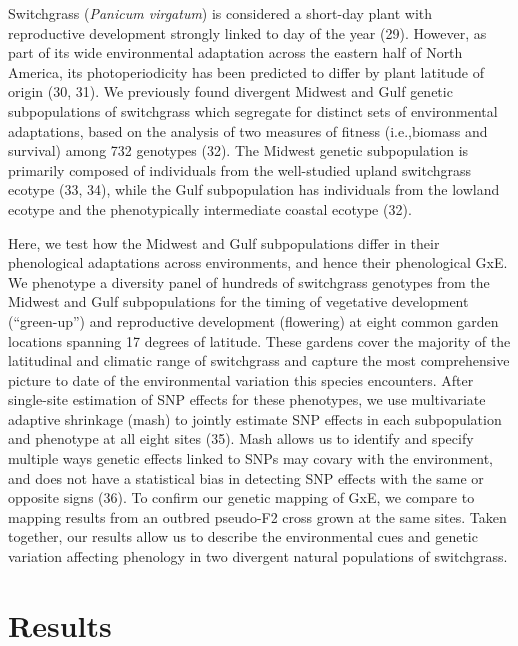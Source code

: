 \documentclass[
  9pt,
  twocolumn,
  twoside]{pnas-new}
\begin{document}
Switchgrass (\emph{Panicum virgatum}) is considered a short-day plant
with reproductive development strongly linked to day of the year (29).
However, as part of its wide environmental adaptation across the eastern
half of North America, its photoperiodicity has been predicted to differ
by plant latitude of origin (30, 31). We previously found divergent
Midwest and Gulf genetic subpopulations of switchgrass which segregate
for distinct sets of environmental adaptations, based on the analysis of
two measures of fitness (i.e.,biomass and survival) among 732 genotypes
(32). The Midwest genetic subpopulation is primarily composed of
individuals from the well-studied upland switchgrass ecotype (33, 34),
while the Gulf subpopulation has individuals from the lowland ecotype
and the phenotypically intermediate coastal ecotype (32).

Here, we test how the Midwest and Gulf subpopulations differ in their
phenological adaptations across environments, and hence their
phenological GxE. We phenotype a diversity panel of hundreds of
switchgrass genotypes from the Midwest and Gulf subpopulations for the
timing of vegetative development (``green-up'') and reproductive
development (flowering) at eight common garden locations spanning 17
degrees of latitude. These gardens cover the majority of the latitudinal
and climatic range of switchgrass and capture the most comprehensive
picture to date of the environmental variation this species encounters.
After single-site estimation of SNP effects for these phenotypes, we use
multivariate adaptive shrinkage (mash) to jointly estimate SNP effects
in each subpopulation and phenotype at all eight sites (35). Mash allows
us to identify and specify multiple ways genetic effects linked to SNPs
may covary with the environment, and does not have a statistical bias in
detecting SNP effects with the same or opposite signs (36). To confirm
our genetic mapping of GxE, we compare to mapping results from an
outbred pseudo-F2 cross grown at the same sites. Taken together, our
results allow us to describe the environmental cues and genetic
variation affecting phenology in two divergent natural populations of
switchgrass.

\section{Results}\label{results}
\end{document}
